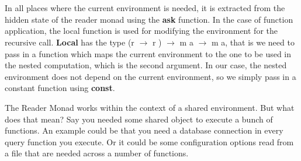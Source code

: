 \documentclass[a4paper,10pt]{article}
\begin{document}
\\\\In all places where the current environment is needed, it is extracted from the hidden state of
the reader monad using the \textbf{ask} function. In the case of function application, the local function
is used for modifying the environment for the recursive call. \textbf{Local} has the type (r $\rightarrow$ r ) $\rightarrow$
m a $\rightarrow$ m a, that is we need to pass in a function which maps the current environment to
the one to be used in the nested computation, which is the second argument. In our case, the
nested environment does not depend on the current environment, so we simply pass in a constant
function using \textbf{const}.

The Reader Monad works within the context of a shared environment. But what does that mean? Say you needed some shared object to execute a bunch of functions. An example could be that you need a database connection in every query function you execute. Or it could be some configuration options read from a file that are needed across a number of functions.
\newpage
\end{document}
